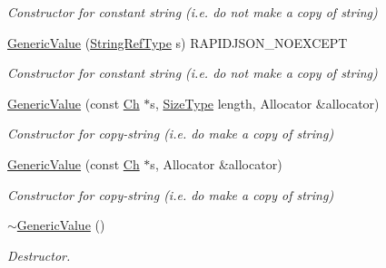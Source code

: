 \begin{DoxyCompactItemize}
\begin{DoxyCompactList}\small\item\em Constructor for constant string (i.\+e. do not make a copy of string) \end{DoxyCompactList}\item 
\hypertarget{class_generic_value_abb2887958974fef1b2b5c8e32cc72ddb}{}\hyperlink{class_generic_value_abb2887958974fef1b2b5c8e32cc72ddb}{Generic\+Value} (\hyperlink{class_generic_value_a32e0f30ee278072374c8168b14d3317f}{String\+Ref\+Type} s) R\+A\+P\+I\+D\+J\+S\+O\+N\+\_\+\+N\+O\+E\+X\+C\+E\+P\+T\label{class_generic_value_abb2887958974fef1b2b5c8e32cc72ddb}

\begin{DoxyCompactList}\small\item\em Constructor for constant string (i.\+e. do not make a copy of string) \end{DoxyCompactList}\item 
\hypertarget{class_generic_value_a9ec2c7cda8c8845acfa3565c6b1b4e10}{}\hyperlink{class_generic_value_a9ec2c7cda8c8845acfa3565c6b1b4e10}{Generic\+Value} (const \hyperlink{class_generic_value_ade0e0ce64ccd5d852da57a35e720bafb}{Ch} $\ast$s, \hyperlink{rapidjson_8h_a5ed6e6e67250fadbd041127e6386dcb5}{Size\+Type} length, Allocator \&allocator)\label{class_generic_value_a9ec2c7cda8c8845acfa3565c6b1b4e10}

\begin{DoxyCompactList}\small\item\em Constructor for copy-\/string (i.\+e. do make a copy of string) \end{DoxyCompactList}\item 
\hypertarget{class_generic_value_a9b72b2e3347d4cd77b16c3b45e8decf1}{}\hyperlink{class_generic_value_a9b72b2e3347d4cd77b16c3b45e8decf1}{Generic\+Value} (const \hyperlink{class_generic_value_ade0e0ce64ccd5d852da57a35e720bafb}{Ch} $\ast$s, Allocator \&allocator)\label{class_generic_value_a9b72b2e3347d4cd77b16c3b45e8decf1}

\begin{DoxyCompactList}\small\item\em Constructor for copy-\/string (i.\+e. do make a copy of string) \end{DoxyCompactList}\item 
\hyperlink{class_generic_value_a213ba89ef5ef961a5e655bd8c78ac9f4}{$\sim$\+Generic\+Value} ()
\begin{DoxyCompactList}\small\item\em Destructor. \end{DoxyCompactList}\end{DoxyCompactItemize}


